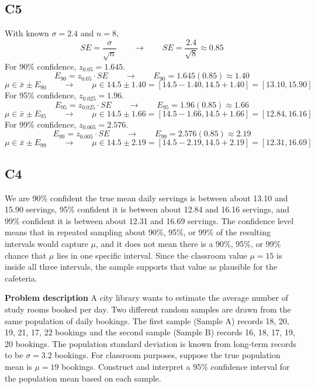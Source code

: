 \begin{ExamProblems}
		\subsection*{C5}
		With known $\sigma = 2.4$ and $n=8$,
		\[
		SE = \frac{\sigma}{\sqrt{n}} \qquad \longrightarrow \qquad SE = \frac{2.4}{\sqrt{8}} \approx 0.85
		\]
		For 90\% confidence, $z_{0.05}=1.645$.
		\[
		E_{90} = z_{0.05} \cdot SE \qquad \longrightarrow \qquad E_{90} = 1.645(0.85) \approx 1.40
		\]
		\[
		\mu \in \bar{x} \pm E_{90} \qquad \longrightarrow \qquad \mu \in 14.5 \pm 1.40 = [14.5 - 1.40, 14.5 + 1.40] = [13.10, 15.90]
		\]
		For 95\% confidence, $z_{0.025}=1.96$.
		\[
		E_{95} = z_{0.025} \cdot SE \qquad \longrightarrow \qquad E_{95} = 1.96(0.85) \approx 1.66
		\]
		\[
		\mu \in \bar{x} \pm E_{95} \qquad \longrightarrow \qquad \mu \in 14.5 \pm 1.66 = [14.5 - 1.66, 14.5 + 1.66] = [12.84, 16.16]
		\]
		For 99\% confidence, $z_{0.005}=2.576$.
		\[
		E_{99} = z_{0.005} \cdot SE \qquad \longrightarrow \qquad E_{99} = 2.576(0.85) \approx 2.19
		\]
		\[
		\mu \in \bar{x} \pm E_{99} \qquad \longrightarrow \qquad \mu \in 14.5 \pm 2.19 = [14.5 - 2.19, 14.5 + 2.19] = [12.31, 16.69]
		\]

		\subsection*{C4}
		We are 90\% confident the true mean daily servings is between about 13.10 and 15.90 servings, 95\% confident it is between about 12.84 and 16.16 servings, and 99\% confident it is between about 12.31 and 16.69 servings. The confidence level means that in repeated sampling about 90\%, 95\%, or 99\% of the resulting intervals would capture $\mu$, and it does not mean there is a 90\%, 95\%, or 99\% chance that $\mu$ lies in one specific interval. Since the classroom value $\mu = 15$ is inside all three intervals, the sample supports that value as plausible for the cafeteria.

		\newpage
		\item
		\textbf{Problem description}
		A city library wants to estimate the average number of study rooms booked per day.
		Two different random samples are drawn from the same population of daily bookings.
		The first sample (Sample A) records 18, 20, 19, 21, 17, 22 bookings and the second sample (Sample B) records 16, 18, 17, 19, 20 bookings.
		The population standard deviation is known from long-term records to be \(\sigma = 3.2\) bookings.
		For classroom purposes, suppose the true population mean is \(\mu = 19\) bookings.
		Construct and interpret a 95\% confidence interval for the population mean based on each sample.


\end{ExamProblems}
